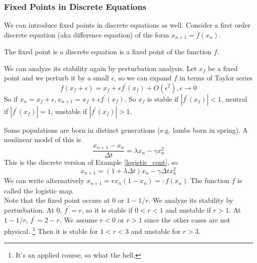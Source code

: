 \subsubsection{Fixed Points in Discrete Equations}
We can introduce fixed points in discrete equations as well.
Consider a first order discrete equation (aka difference equation) of the form $x_{n+1}=f(x_n)$.
\begin{definition}
    The fixed point is a discrete equation is a fixed point of the function $f$.
\end{definition}
We can analyze its stability again by perturbation analysis.
Let $x_f$ be a fixed point and we perturb it by a small $\epsilon$, so we can expand $f$ in terms of Taylor series
$$f(x_f+\epsilon)=x_f+\epsilon f^\prime(x_f)+O(\epsilon^2),\epsilon\to0$$
So if $x_n=x_f+\epsilon, x_{n+1}=x_f+\epsilon f^\prime(x_f)$.
So $x_f$ is stable if $|f^\prime(x_f)|<1$, neutral if $|f^\prime(x_f)|=1$, unstable if $|f^\prime(x_f)|>1$.
\begin{example}
    Some populations are born in distinct generations (e.g. lambs born in spring).
    A nonlinear model of this is
    $$\frac{x_{n+1}-x_n}{\Delta t}=\lambda x_n-\gamma x_n^2$$
    This is the discrete version of Example \ref{logistic_cont}, so
    $$x_{n+1}=(1+\lambda\Delta t)x_n-\gamma\Delta tx_n^2$$
    We can write alternatively $x_{n+1}=rx_n(1-x_n)=:f(x_n)$
    The function $f$ is called the logistic map.\\
    Note that the fixed point occurs at $0$ or $1-1/r$.
    We analyze its stability by perturbation.
    At $0$, $f^\prime=r$, so it is stable if $0<r<1$ and unstable if $r>1$.
    At $1-1/r$, $f^\prime=2-r$.
    We assume $r<0$ or $r>1$ since the other cases are not physical.
    \footnote{It's an applied course, so what the hell.}
    Then it is stable for $1<r<3$ and unstable for $r>3$.
\end{example}
